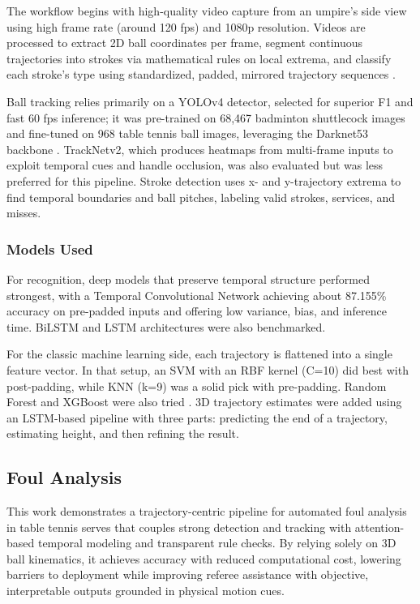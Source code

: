 \documentclass[conference]{IEEEtran}
\begin{document}
The workflow begins with high-quality video capture from an umpire's side view using high frame rate (around 120 fps) and 1080p resolution. Videos are processed to extract 2D ball coordinates per frame, segment continuous trajectories into strokes via mathematical rules on local extrema, and classify each stroke's type using standardized, padded, mirrored trajectory sequences \cite{strokanadball}.

Ball tracking relies primarily on a YOLOv4 detector, selected for superior F1 and fast 60 fps inference; it was pre-trained on 68,467 badminton shuttlecock images and fine-tuned on 968 table tennis ball images, leveraging the Darknet53 backbone \cite{strokaandball}. TrackNetv2, which produces heatmaps from multi-frame inputs to exploit temporal cues and handle occlusion, was also evaluated but was less preferred for this pipeline. Stroke detection uses x- and y-trajectory extrema to find temporal boundaries and ball pitches, labeling valid strokes, services, and misses.

\subsubsection{Models Used}

For recognition, deep models that preserve temporal structure performed strongest, with a Temporal Convolutional Network achieving about 87.155\% accuracy \cite{strokeandball} on pre-padded inputs and offering low variance, bias, and inference time. BiLSTM and LSTM architectures were also benchmarked.

For the classic machine learning side, each trajectory is flattened into a single feature vector. In that setup, an SVM with an RBF kernel (C=10) did best with post-padding, while KNN (k=9) was a solid pick with pre-padding. Random Forest and XGBoost were also tried \cite{strokeandball}. 3D trajectory estimates were added using an LSTM-based pipeline with three parts: predicting the end of a trajectory, estimating height, and then refining the result.

\subsection{Foul Analysis}

This work demonstrates a trajectory-centric pipeline for automated foul analysis in table tennis serves \cite{art} that couples strong detection and tracking with attention-based temporal modeling and transparent rule checks. By relying solely on 3D ball kinematics, it achieves accuracy with reduced computational cost, lowering barriers to deployment while improving referee assistance with objective, interpretable outputs grounded in physical motion cues.
\end{document}
